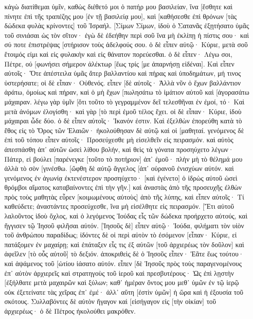 κἀγὼ διατίθεμαι ὑμῖν, καθὼς διέθετό μοι ὁ πατήρ μου βασιλείαν, 
ἵνα [ἔσθητε καὶ πίνητε ἐπὶ τῆς τραπέζης μου [ἐν τῇ βασιλείᾳ μου], καὶ [καθήσεσθε ἐπὶ θρόνων [τὰς δώδεκα φυλὰς κρίνοντες] τοῦ Ἰσραήλ. 
[Σίμων Σίμων, ἰδοὺ ὁ Σατανᾶς ἐξῃτήσατο ὑμᾶς τοῦ σινιάσαι ὡς τὸν σῖτον· 
ἐγὼ δὲ ἐδεήθην περὶ σοῦ ἵνα μὴ ἐκλίπῃ ἡ πίστις σου· καὶ σύ ποτε ἐπιστρέψας [στήρισον τοὺς ἀδελφούς σου. 
ὁ δὲ εἶπεν αὐτῷ· Κύριε, μετὰ σοῦ ἕτοιμός εἰμι καὶ εἰς φυλακὴν καὶ εἰς θάνατον πορεύεσθαι. 
ὁ δὲ εἶπεν· Λέγω σοι, Πέτρε, οὐ [φωνήσει σήμερον ἀλέκτωρ [ἕως τρίς [με ἀπαρνήσῃ εἰδέναι]. 
Καὶ εἶπεν αὐτοῖς· Ὅτε ἀπέστειλα ὑμᾶς ἄτερ βαλλαντίου καὶ πήρας καὶ ὑποδημάτων, μή τινος ὑστερήσατε; οἱ δὲ εἶπαν· Οὐθενός. 
εἶπεν [δὲ αὐτοῖς· Ἀλλὰ νῦν ὁ ἔχων βαλλάντιον ἀράτω, ὁμοίως καὶ πήραν, καὶ ὁ μὴ ἔχων [πωλησάτω τὸ ἱμάτιον αὐτοῦ καὶ [ἀγορασάτω μάχαιραν. 
λέγω γὰρ ὑμῖν [ὅτι τοῦτο τὸ γεγραμμένον δεῖ τελεσθῆναι ἐν ἐμοί, τό· Καὶ μετὰ ἀνόμων ἐλογίσθη· καὶ γὰρ [τὸ περὶ ἐμοῦ τέλος ἔχει. 
οἱ δὲ εἶπαν· Κύριε, ἰδοὺ μάχαιραι ὧδε δύο. ὁ δὲ εἶπεν αὐτοῖς· Ἱκανόν ἐστιν. 
Καὶ ἐξελθὼν ἐπορεύθη κατὰ τὸ ἔθος εἰς τὸ Ὄρος τῶν Ἐλαιῶν· ἠκολούθησαν δὲ αὐτῷ καὶ οἱ [μαθηταί. 
γενόμενος δὲ ἐπὶ τοῦ τόπου εἶπεν αὐτοῖς· Προσεύχεσθε μὴ εἰσελθεῖν εἰς πειρασμόν. 
καὶ αὐτὸς ἀπεσπάσθη ἀπ᾽ αὐτῶν ὡσεὶ λίθου βολήν, καὶ θεὶς τὰ γόνατα προσηύχετο 
λέγων· Πάτερ, εἰ βούλει [παρένεγκε [τοῦτο τὸ ποτήριον] ἀπ᾽ ἐμοῦ· πλὴν μὴ τὸ θέλημά μου ἀλλὰ τὸ σὸν [γινέσθω. 
[ὤφθη δὲ αὐτῷ ἄγγελος [ἀπ᾽ οὐρανοῦ ἐνισχύων αὐτόν. 
καὶ γενόμενος ἐν ἀγωνίᾳ ἐκτενέστερον προσηύχετο· [καὶ ἐγένετο] ὁ ἱδρὼς αὐτοῦ ὡσεὶ θρόμβοι αἵματος καταβαίνοντες ἐπὶ τὴν γῆν.] 
καὶ ἀναστὰς ἀπὸ τῆς προσευχῆς ἐλθὼν πρὸς τοὺς μαθητὰς εὗρεν [κοιμωμένους αὐτοὺς] ἀπὸ τῆς λύπης, 
καὶ εἶπεν αὐτοῖς· Τί καθεύδετε; ἀναστάντες προσεύχεσθε, ἵνα μὴ εἰσέλθητε εἰς πειρασμόν. 
[Ἔτι αὐτοῦ λαλοῦντος ἰδοὺ ὄχλος, καὶ ὁ λεγόμενος Ἰούδας εἷς τῶν δώδεκα προήρχετο αὐτούς, καὶ ἤγγισεν τῷ Ἰησοῦ φιλῆσαι αὐτόν. 
[Ἰησοῦς δὲ] εἶπεν αὐτῷ· Ἰούδα, φιλήματι τὸν υἱὸν τοῦ ἀνθρώπου παραδίδως; 
ἰδόντες δὲ οἱ περὶ αὐτὸν τὸ ἐσόμενον [εἶπαν· Κύριε, εἰ πατάξομεν ἐν μαχαίρῃ; 
καὶ ἐπάταξεν εἷς τις ἐξ αὐτῶν [τοῦ ἀρχιερέως τὸν δοῦλον] καὶ ἀφεῖλεν [τὸ οὖς αὐτοῦ] τὸ δεξιόν. 
ἀποκριθεὶς δὲ ὁ Ἰησοῦς εἶπεν· Ἐᾶτε ἕως τούτου· καὶ ἁψάμενος τοῦ [ὠτίου ἰάσατο αὐτόν. 
εἶπεν [δὲ Ἰησοῦς πρὸς τοὺς παραγενομένους ἐπ᾽ αὐτὸν ἀρχιερεῖς καὶ στρατηγοὺς τοῦ ἱεροῦ καὶ πρεσβυτέρους· Ὡς ἐπὶ λῃστὴν [ἐξήλθατε μετὰ μαχαιρῶν καὶ ξύλων; 
καθ᾽ ἡμέραν ὄντος μου μεθ᾽ ὑμῶν ἐν τῷ ἱερῷ οὐκ ἐξετείνατε τὰς χεῖρας ἐπ᾽ ἐμέ· ἀλλ᾽ αὕτη [ἐστὶν ὑμῶν] ἡ ὥρα καὶ ἡ ἐξουσία τοῦ σκότους. 
Συλλαβόντες δὲ αὐτὸν ἤγαγον καὶ [εἰσήγαγον εἰς [τὴν οἰκίαν] τοῦ ἀρχιερέως· ὁ δὲ Πέτρος ἠκολούθει μακρόθεν. 
